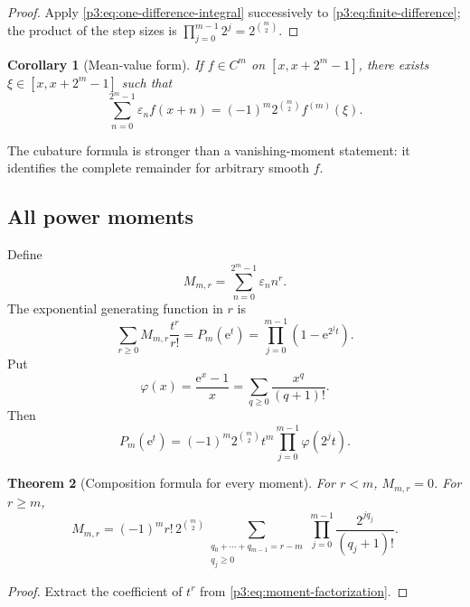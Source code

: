 \documentclass[11pt,oneside]{article}
\newtheorem{theorem}{Theorem}[section]
\newtheorem{corollary}[theorem]{Corollary}
\theoremstyle{definition}
\theoremstyle{remark}
\newcommand{\e}{\mathrm e}
\newcommand{\eps}{\varepsilon}
\begin{document}
\begin{proof}
Apply \cref{p3:eq:one-difference-integral} successively to
\cref{p3:eq:finite-difference}; the product of the step sizes is
$\prod_{j=0}^{m-1}2^j=2^{\binom m2}$.
\end{proof}

\begin{corollary}[Mean-value form]\label{p3:cor:mean-value}
If $f\in C^m$ on $[x,x+2^m-1]$, there exists
$\xi\in[x,x+2^m-1]$ such that
\begin{equation}\label{p3:eq:mean-value}
 \sum_{n=0}^{2^m-1}\eps_nf(x+n)
 =(-1)^m2^{\binom m2}f^{(m)}(\xi).
\end{equation}
\end{corollary}

The cubature formula is stronger than a vanishing-moment statement: it
identifies the complete remainder for arbitrary smooth $f$.

\subsection{All power moments}

Define
\begin{equation}\label{p3:eq:moment-def}
 M_{m,r}=\sum_{n=0}^{2^m-1}\eps_nn^r.
\end{equation}
The exponential generating function in $r$ is
\begin{equation}\label{p3:eq:moment-egf}
 \sum_{r\ge0}M_{m,r}\frac{t^r}{r!}
 =P_m(\e^t)
 =\prod_{j=0}^{m-1}(1-\e^{2^jt}).
\end{equation}
Put
\[
 \varphi(x)=\frac{\e^x-1}{x}=\sum_{q\ge0}\frac{x^q}{(q+1)!}.
\]
Then
\begin{equation}\label{p3:eq:moment-factorization}
 P_m(\e^t)=(-1)^m2^{\binom m2}t^m
 \prod_{j=0}^{m-1}\varphi(2^jt).
\end{equation}

\begin{theorem}[Composition formula for every moment]\label{p3:thm:all-moments}
For $r<m$, $M_{m,r}=0$.  For $r\ge m$,
\begin{equation}\label{p3:eq:all-moments-composition}
 \boxed{\quad
 M_{m,r}=(-1)^m r!\,2^{\binom m2}
 \sum_{\substack{q_0+\cdots+q_{m-1}=r-m\\q_j\ge0}}
 \prod_{j=0}^{m-1}\frac{2^{jq_j}}{(q_j+1)!}.
 \quad}
\end{equation}
\end{theorem}

\begin{proof}
Extract the coefficient of $t^r$ from
\cref{p3:eq:moment-factorization}.
\end{proof}
\end{document}
